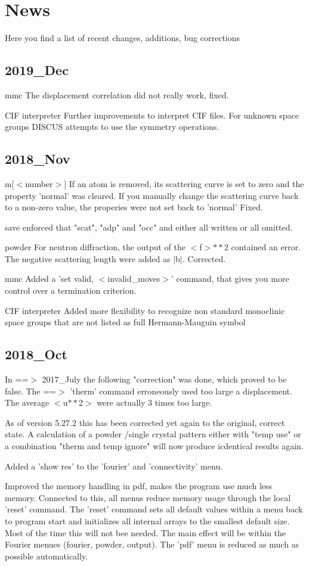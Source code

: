 \section{News}
\par
Here you find a list of recent changes, additions, bug corrections 
\subsection*{2019\_Dec}
\par
mmc 
   The displacement correlation did not really work, fixed. 
\par
CIF interpreter 
   Further improvements to interpret CIF files. For unknown 
   space groups DISCUS attempts to use the symmetry operations. 
\subsection*{2018\_Nov}
\par
m[$ <$number$> $] 
   If an atom is removed, its scattering curve is set to zero and 
   the property 'normal' was cleared. 
   If you manually change the scattering curve back to a non-zero 
   value, the properies were not set back to 'normal' Fixed. 
\par
save 
   enforced that "scat", "adp" and "occ" and either all written 
   or all omitted. 
\par
powder 
   For neutron diffraction, the output of the $ <$f$> $$**$2 contained an 
   error. The negative scattering length were added as $| $b$| $. 
   Corrected. 
\par
mmc 
   Added a 'set valid, $ <$invalid\_moves$> $' command, that gives you more 
   control over a termination criterion. 
\par
CIF interpreter 
   Added more flexibility to recognize non standard monoclinic space 
   groups that are not listed as full Hermann-Mauguin symbol 
\subsection*{2018\_Oct}
\par
In ==$> $ 2017\_July the following "correction" was done, which proved 
to be false. 
The ==$> $ 'therm' command erroneously used too large a displacement. 
The average $ <$u$**$2$> $ were actually 3 times too large. 
\par
As of version 5.27.2 this has been corrected yet again to the 
original, correct state. A calculation of a powder /single crystal 
pattern either with "temp use" or a combination "therm and temp ignore" 
will now produce icdentical results again. 
\par
Added a 'show res' to the 'fourier' and 'connectivity' menu. 
\par
Improved the memory handling in pdf, makes the program use much 
less memory. 
Connected to this, all menus reduce memory usage through the 
local 'reset' command. The 'reset' command sets all default 
values within a menu back to program start and initializes all 
internal arrays to the smallest default size. Most of the time 
this will not bee needed. The main effect will be within the 
Fourier menues (fourier, powder, output). The 'pdf' menu is 
reduced as much as possible automatically. 
\par
